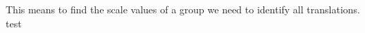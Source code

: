 \documentclass[preview]{standalone}
\begin{document}
This means to find the scale values of a group we need to identify all translations. test\\
\end{document}
